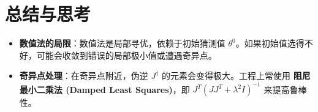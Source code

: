 \section{总结与思考}
\begin{itemize}
    \item \textbf{数值法的局限}：数值法是局部寻优，依赖于初始猜测值 $\theta^0$。如果初始值选得不好，可能会收敛到错误的局部极小值或遭遇奇异点。
    \item \textbf{奇异点处理}：在奇异点附近，伪逆 $J^\dagger$ 的元素会变得极大。工程上常使用 \textbf{阻尼最小二乘法 (Damped Least Squares)}，即 $J^T (J J^T + \lambda^2 I)^{-1}$ 来提高鲁棒性。
\end{itemize}
